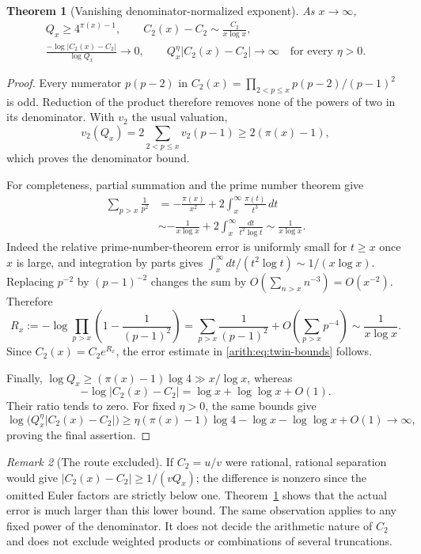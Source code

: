 \documentclass[11pt,a4paper]{article}
\newtheorem{theorem}{Theorem}[section]
\theoremstyle{definition}\newtheorem{definition}[theorem]{Definition}
\theoremstyle{remark}\newtheorem{remark}[theorem]{Remark}
\begin{document}
\begin{theorem}[Vanishing denominator-normalized exponent]
\label{arith:thm:twin}
As $x\to\infty$,
\begin{gather}
 Q_x\ge4^{\pi(x)-1},\qquad
 C_2(x)-C_2\sim\frac{C_2}{x\log x},
       \label{arith:eq:twin-bounds}\\
 \frac{-\log|C_2(x)-C_2|}{\log Q_x}\longrightarrow0,
 \qquad Q_x^{\eta}|C_2(x)-C_2|\longrightarrow\infty
       \quad\text{for every }\eta>0.
       \label{arith:eq:twin-exponent}
\end{gather}
\end{theorem}
\begin{proof}
Every numerator $p(p-2)$ in
$C_2(x)=\prod_{2<p\le x}p(p-2)/(p-1)^2$ is odd.
Reduction of the product therefore removes none of the powers of two
in its denominator.  With $v_2$ the usual valuation,
\[
 v_2(Q_x)=2\sum_{2<p\le x}v_2(p-1)\ge2(\pi(x)-1),
\]
which proves the denominator bound.

For completeness, partial summation and the prime number theorem give
\begin{align*}
 \sum_{p>x}\frac1{p^2}
  &=-\frac{\pi(x)}{x^2}+2\int_x^{\infty}\frac{\pi(t)}{t^3}\,dt\\
  &\sim-\frac1{x\log x}
                  +2\int_x^{\infty}\frac{dt}{t^2\log t}
   \sim\frac1{x\log x}.
\end{align*}
Indeed the relative prime-number-theorem error is uniformly small for
$t\ge x$ once $x$ is large, and integration by parts gives
$\int_x^{\infty}dt/(t^2\log t)\sim1/(x\log x)$.
Replacing $p^{-2}$ by $(p-1)^{-2}$ changes the sum by
$O(\sum_{n>x}n^{-3})=O(x^{-2})$.  Therefore
\[
 R_x:=-\log\prod_{p>x}\left(1-\frac1{(p-1)^2}\right)
 =\sum_{p>x}\frac1{(p-1)^2}
       +O\!\left(\sum_{p>x}p^{-4}\right)
 \sim\frac1{x\log x}.
\]
Since $C_2(x)=C_2e^{R_x}$, the error estimate in
\eqref{arith:eq:twin-bounds} follows.

Finally, $\log Q_x\ge(\pi(x)-1)\log4\gg x/\log x$, whereas
\[
 -\log|C_2(x)-C_2|=\log x+\log\log x+O(1).
\]
Their ratio tends to zero.  For fixed $\eta>0$, the same bounds give
\[
 \log\bigl(Q_x^{\eta}|C_2(x)-C_2|\bigr)
 \ge \eta(\pi(x)-1)\log4-\log x-\log\log x+O(1)
 \longrightarrow\infty,
\]
proving the final assertion.
\end{proof}

\begin{remark}[The route excluded]
If $C_2=u/v$ were rational, rational separation would give
$|C_2(x)-C_2|\ge1/(vQ_x)$; the difference is nonzero since the omitted
Euler factors are strictly below one.  Theorem~\ref{arith:thm:twin}
shows that the actual error is much larger than this lower bound.
The same observation applies to any fixed power of the denominator.
It does not decide the arithmetic nature of $C_2$ and does not exclude
weighted products or combinations of several truncations.
\end{remark}
\end{document}
